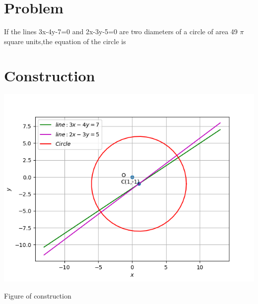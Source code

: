 \documentclass[10pt, a4paper]{article}
\title{\mytitle}
\author{\myauthor\hspace{1em}\\\contact\\FWC22048\hspace{6.5em}IITH\hspace{0.5em}\mymodule\hspace{6em}Assignment}
\begin{document}
	\maketitle
	\tableofcontents
   \section{Problem}
  If the lines 3x-4y-7=0 and 2x-3y-5=0 are two diameters of a circle of area 49 $\pi$ square units,the equation of the circle is 
\section{Construction}
  \includegraphics[scale=0.47]{figure_1.png}
  	\begin{center}
  Figure of construction
  	\end{center}
\end{document}
